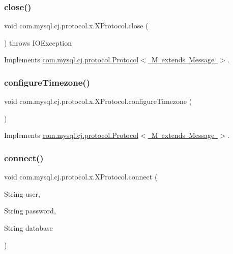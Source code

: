 \subsubsection{\texorpdfstring{close()}{close()}}
{\footnotesize\ttfamily void com.\+mysql.\+cj.\+protocol.\+x.\+X\+Protocol.\+close (\begin{DoxyParamCaption}{ }\end{DoxyParamCaption}) throws I\+O\+Exception}



Implements \mbox{\hyperlink{interfacecom_1_1mysql_1_1cj_1_1protocol_1_1_protocol_ac38e74b2af853f10e7f9a97f6c4836f8}{com.\+mysql.\+cj.\+protocol.\+Protocol$<$ M extends Message $>$}}.

\mbox{\label{classcom_1_1mysql_1_1cj_1_1protocol_1_1x_1_1_x_protocol_ac2eba3a8a26e28626fb976d576f89fb7}} 
\subsubsection{\texorpdfstring{configure\+Timezone()}{configureTimezone()}}
{\footnotesize\ttfamily void com.\+mysql.\+cj.\+protocol.\+x.\+X\+Protocol.\+configure\+Timezone (\begin{DoxyParamCaption}{ }\end{DoxyParamCaption})}



Implements \mbox{\hyperlink{interfacecom_1_1mysql_1_1cj_1_1protocol_1_1_protocol_a21ceb9181ddbbf615ead4ad2e24e5544}{com.\+mysql.\+cj.\+protocol.\+Protocol$<$ M extends Message $>$}}.

\mbox{\label{classcom_1_1mysql_1_1cj_1_1protocol_1_1x_1_1_x_protocol_ad9932aa9ac2484e47e8a4d34e3a8d691}} 
\subsubsection{\texorpdfstring{connect()}{connect()}}
{\footnotesize\ttfamily void com.\+mysql.\+cj.\+protocol.\+x.\+X\+Protocol.\+connect (\begin{DoxyParamCaption}\item[{String}]{user,  }\item[{String}]{password,  }\item[{String}]{database }\end{DoxyParamCaption})}

